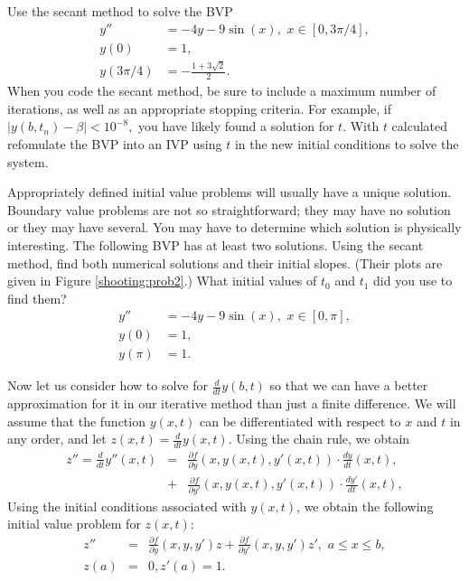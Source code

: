 \begin{problem} Use the secant method to solve the BVP
\begin{equation*}
\begin{split}
y'' &= -4y -9\sin(x), \,\, x \in [0,3\pi/4],\\
y(0) &= 1, \\
y(3\pi/4) &=-\frac{1+3\sqrt{2}}{2}.
\end{split}
\end{equation*}
When you code the secant method, be sure to include a maximum number of iterations, as well as an appropriate stopping criteria. For example, if $|y(b,t_n)-\beta|<10^{-8},$ you have likely found a solution for $t$. With $t$ calculated refomulate the BVP into an IVP using $t$ in the new initial conditions to solve the system.
\end{problem}

\begin{problem} Appropriately defined initial value problems will usually have a unique solution. Boundary value problems are not so straightforward; they may have no solution or they may have several. You may have to determine which solution is physically interesting. The following BVP has at least two solutions. Using the secant method, find both numerical solutions and their initial slopes. (Their plots are given in Figure \eqref{shooting:prob2}.) What initial values of $t_0$ and $t_1$ did you use to find them?
\begin{equation*}
\begin{split}
y'' &= -4y -9\sin(x), \,\, x \in [0,\pi],\\
y(0) &= 1, \\
y(\pi) &=1.
\end{split}
\end{equation*}
\end{problem}

Now let us consider how to solve for $\frac{d}{dt} y(b,t)$ so that we can have a better approximation for it in our iterative method than just a finite difference. We will assume that the function $y(x,t)$ can be differentiated with respect to $x$ and $t$ in any order, and let  $z(x,t) = \frac{d}{dt} y(x,t).$ Using the chain rule, we obtain 
\begin{eqnarray*}
z'' = \frac{d}{dt} y''(x,t) &=& \frac{\partial f}{\partial y} (x,y(x,t),y'(x,t)) \cdot \frac{dy}{dt}(x,t) ,\\
&+& \frac{\partial f}{\partial y'} (x,y(x,t),y'(x,t)) \cdot \frac{dy'}{dt}(x,t),
\end{eqnarray*}
Using the initial conditions associated with $y(x,t)$, we obtain the following initial value problem for $z(x,t)$: 
\begin{eqnarray*}
z'' &=& \frac{\partial f}{\partial y} (x,y,y') z + \frac{\partial f}{\partial y'} (x,y,y') z'
,\,\,a \leq x \leq b, \\
 z(a) &=& 0, z'(a) = 1.
\end{eqnarray*}

